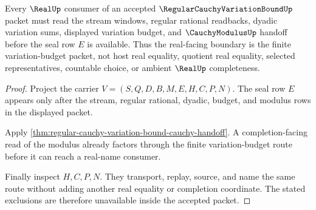 \begin{theorem}
\label{thm:regular-cauchy-variation-bound-real-seal}
Every $\RealUp$ consumer of an accepted $\RegularCauchyVariationBoundUp$ packet must read the stream windows, regular rational readbacks, dyadic variation sums, displayed variation budget, and $\CauchyModulusUp$ handoff before the seal row $E$ is available. Thus the real-facing boundary is the finite variation-budget packet, not host real equality, quotient real equality, selected representatives, countable choice, or ambient $\RealUp$ completeness.
\end{theorem}
\begin{proof}
Project the carrier $V=(S,Q,D,B,M,E,H,C,P,N)$. The seal row $E$ appears only after the stream, regular rational, dyadic, budget, and modulus rows in the displayed packet.

Apply \autoref{thm:regular-cauchy-variation-bound-cauchy-handoff}. A completion-facing read of the modulus already factors through the finite variation-budget route before it can reach a real-name consumer.

Finally inspect $H,C,P,N$. They transport, replay, source, and name the same route without adding another real equality or completion coordinate. The stated exclusions are therefore unavailable inside the accepted packet.
\end{proof}




